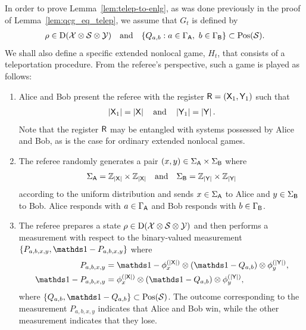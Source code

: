 In order to prove Lemma~\ref{lem:telep-to-enlg}, as was done previously in the proof of Lemma~\ref{lem:qcg_eq_telep}, we assume that $G_t$ is defined by 
\begin{align}
	\rho \in \mathrm{D}(\mathcal{X} \otimes \mathcal{S} \otimes \mathcal{Y}) \quad \textnormal{and} \quad \{Q_{a,b} : a \in \Gamma_{\mathsf{A}}, \ b \in \Gamma_{\mathsf{B}} \} \subset \mathrm{Pos}(\mathcal{S}).
\end{align} 
We shall also define a specific extended nonlocal game, $H_t$, that consists of a teleportation procedure. From the referee's perspective, such a game is played as follows:
\begin{enumerate}
	\item Alice and Bob present the referee with the register $\mathsf{R} = (\mathsf{X}_1, \mathsf{Y}_1)$ such that 
		\begin{align}
			\left\lvert \mathsf{X}_1 \right\rvert = \left\lvert \mathsf{X} \right\rvert \quad \textnormal{and} \quad \left\lvert \mathsf{Y}_1 \right\rvert = \left\lvert \mathsf{Y} \right\rvert.
		\end{align}
	Note that the register $\mathsf{R}$ may be entangled with systems possessed by Alice and Bob, as is the case for ordinary extended nonlocal games. 
	
	\item The referee randomly generates a pair $(x,y) \in \Sigma_{\mathsf{A}} \times \Sigma_{\mathsf{B}}$ where
	\begin{align}
		\Sigma_{\mathsf{A}} = \mathbb{Z}_{\left\lvert \mathsf{X} \right\rvert} \times \mathbb{Z}_{\left\lvert \mathsf{X} \right\rvert} \quad \textnormal{and} \quad \Sigma_{\mathsf{B}} = \mathbb{Z}_{\left\lvert \mathsf{Y} \right\rvert} \times \mathbb{Z}_{\left\lvert \mathsf{Y} \right\rvert}	
	\end{align}		
according to the uniform distribution and sends $x \in \Sigma_{\mathsf{A}}$ to Alice and $y \in \Sigma_{\mathsf{B}}$ to Bob. Alice responds with $a \in \Gamma_{\mathsf{A}}$ and Bob responds with $b \in \Gamma_{\mathsf{B}}$. 
	
	\item The referee prepares a state $\rho \in \mathrm{D}(\mathcal{X} \otimes \mathcal{S} \otimes \mathcal{Y})$ and then performs a measurement with respect to the binary-valued measurement $\{ P_{a,b,x,y}, \I - P_{a,b,x,y} \}$ where
\begin{equation} \label{eq:ref-meas-telep-enlg}
	\begin{aligned}
		P_{a,b,x,y} &= \I - \phi^{(\abs{\reg{X}})}_{x} \otimes \left( \I - Q_{a,b} \right) \otimes \phi^{(\abs{\reg{Y}})}_y, \\
		\I - P_{a,b,x,y} &= \phi^{(\abs{\reg{X}})}_{x} \otimes \left( \I - Q_{a,b} \right) \otimes \phi^{(\abs{\reg{Y}})}_y, \\
	\end{aligned}	
\end{equation}	 
where $\{Q_{a,b}, \I - Q_{a,b} \} \subset \Pos(\S)$. The outcome corresponding to the measurement $P_{a,b,x,y}$ indicates that Alice and Bob win, while the other measurement indicates that they lose. 
\end{enumerate}
